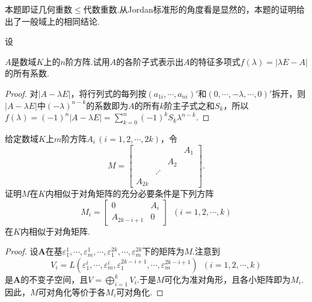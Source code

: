 \begin{note}
	本题即证几何重数$\le$代数重数.从Jordan标准形的角度看是显然的，本题的证明给出了一般域上的相同结论.
\end{note}
\begin{prob}[29]
	\hypertarget{EigenPolynomial}{设}$A$是数域$K$上的$n$阶方阵.试用$A$的各阶子式表示出$A$的特征多项式$f(\lambda)=|\lambda E-A|$的所有系数.
\end{prob}
\begin{proof}
	对$|A-\lambda E|$，将行列式的每列按$(a_{1i},\cdots,a_{ni})'$和$(0,\cdots,-\lambda,\cdots,0)'$拆开，则$|A-\lambda E|$中$(-\lambda)^{n-k}$的系数即为$A$的所有$k$阶主子式之和$S_k$，所以$f(\lambda)=(-1)^n|A-\lambda E|=\displaystyle\sum_{k=0}^{n}(-1)^kS_k\lambda^{n-k}$.
\end{proof}
\begin{prob}[30]
	给定数域$K$上$m$阶方阵$A_i\,(i=1,2,\cdots,2k)$，令
	\[
		M=\begin{bmatrix}
			       &         &     & A_1 \\
			       &         & A_2 &     \\
			       & \iddots &     &     \\
			A_{2k} &         &     &
		\end{bmatrix}.
	\]
	证明$M$在$K$内相似于对角矩阵的充分必要条件是下列方阵
	\[
		M_i=\begin{bmatrix}
			0          & A_i \\
			A_{2k-i+1} & 0
		\end{bmatrix}\enspace(i=1,2,\cdots,k)
	\]
	在$K$内相似于对角矩阵.
\end{prob}
\begin{proof}
	设$\bm A$在基$\varepsilon_1^1,\cdots,\varepsilon_m^1,\cdots,\varepsilon_1^{2k},\cdots,\varepsilon_m^{2k}$下的矩阵为$M$.注意到
	\[
		V_i=L(\varepsilon_1^i,\cdots,\varepsilon_m^i,\varepsilon_1^{2k-i+1},\cdots,\varepsilon_m^{2k-i+1})\enspace(i=1,2,\cdots,k)
	\]
	是$\bm A$的不变子空间，且$V=\displaystyle\bigoplus_{i=1}^kV_i$.于是$M$可化为准对角形，且各小矩阵即为$M_i$.因此，$M$可对角化等价于各$M_i$可对角化.
\end{proof}
